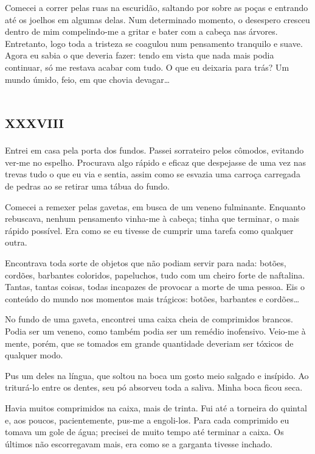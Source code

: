 Comecei a correr pelas ruas na escuridão, saltando por sobre as poças e entrando até os joelhos em algumas delas.
Num determinado momento, o desespero cresceu dentro de mim compelindo-me a gritar e bater com a cabeça nas árvores. Entretanto, logo toda a tristeza se coagulou num pensamento tranquilo e suave. Agora eu sabia o que deveria fazer: tendo em vista que nada mais podia continuar, só me restava acabar com tudo. O que eu deixaria para trás? Um mundo úmido, feio, em que chovia devagar\dots


\chapter*{\huge\centering\textsc{xxxviii}}

Entrei em casa pela porta dos fundos. Passei sorrateiro pelos cômodos, evitando ver-me no espelho. Procurava algo rápido e eficaz que despejasse de uma vez nas trevas tudo o que eu via e sentia, assim como se esvazia uma carroça carregada de pedras ao se retirar uma tábua do fundo.

Comecei a remexer pelas gavetas, em busca de um veneno fulminante. Enquanto rebuscava, nenhum pensamento vinha-me à cabeça; tinha que terminar, o mais rápido possível. Era como se eu tivesse de cumprir uma tarefa como qualquer outra. 

Encontrava toda sorte de objetos que não podiam servir para nada: botões, cordões, barbantes coloridos, papeluchos, tudo com um cheiro forte de naftalina. Tantas, tantas coisas, todas incapazes de provocar a morte de uma pessoa. Eis o conteúdo do mundo nos momentos mais trágicos: botões, barbantes e cordões\dots

No fundo de uma gaveta, encontrei uma caixa cheia de comprimidos brancos. Podia ser um veneno, como também podia ser um remédio inofensivo. Veio-me à mente, porém, que se tomados em grande quantidade deveriam ser tóxicos de qualquer modo.

Pus um deles na língua, que soltou na boca um gosto meio salgado e insípido. Ao triturá-lo entre os dentes, seu pó absorveu toda a saliva. Minha boca ficou seca.

Havia muitos comprimidos na caixa, mais de trinta. Fui até a torneira do quintal e, aos poucos, pacientemente, pus-me a engoli-los.
Para cada comprimido eu tomava um gole de água; precisei de muito tempo até terminar a caixa. Os últimos não escorregavam mais, era como se a garganta tivesse inchado.

